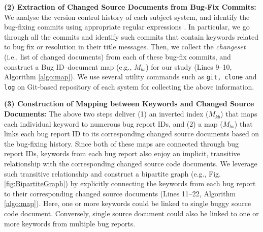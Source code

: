 \documentclass[sigconf,review,anonymous]{acmart}
\begin{document}
\textbf{(2) Extraction of Changed Source Documents from Bug-Fix Commits:}
We analyse the version control history of each subject system, and identify the bug-fixing commits using appropriate regular expressions \cite{bugid,Wang2}.
In particular, we go through all the commits and identify such commits that contain keywords related to bug fix or resolution in their title messages.
Then, we collect the \emph{changeset} (i.e., list of changed documents)
from each of these bug-fix commits, and construct a Bug ID--document map (e.g., $M_{bs}$) for our study (Lines 9--10, Algorithm \ref{algo:map}). 
We use several
utility commands such as \texttt{git, clone} and \texttt{log} on Git-based repository of each system for collecting the above information.



\textbf{(3) Construction of Mapping between Keywords and Changed Source Documents:}
The above two steps deliver (1) an inverted index ($M_{kb}$) that maps each individual keyword to numerous bug report IDs, and (2) a map ($M_{bs}$) that links each bug report ID to its corresponding changed source documents based on the bug-fixing history.
Since both of these maps are connected through bug report IDs,
keywords from each bug report also enjoy an implicit, transitive relationship with the corresponding changed source code documents.
We leverage such transitive relationship and construct a bipartite graph (e.g., Fig. \ref{fig:BipartiteGraph}) by explicitly connecting the keywords from each bug report to their corresponding changed source documents (Lines 11--22, Algorithm \ref{algo:map}).
Here, one or more keywords could be linked to single buggy source code document. Conversely, single source document could also be linked to one or more keywords from multiple bug reports. 
\end{document}
